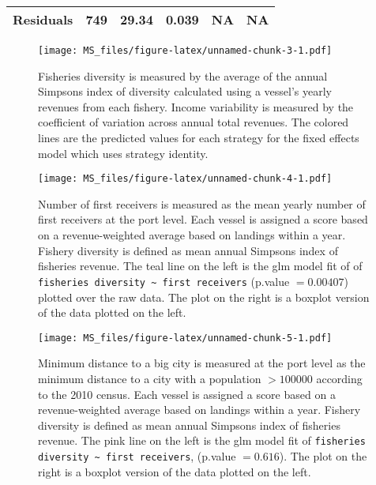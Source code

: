 \documentclass[]{article}
\begin{document}
\begin{longtable}[c]{@{}llllll@{}}
\begin{minipage}[t]{0.36\columnwidth}\raggedright\strut
\textbf{Residuals}
\strut\end{minipage} &
\begin{minipage}[t]{0.05\columnwidth}\raggedright\strut
749
\strut\end{minipage} &
\begin{minipage}[t]{0.10\columnwidth}\raggedright\strut
29.34
\strut\end{minipage} &
\begin{minipage}[t]{0.11\columnwidth}\raggedright\strut
0.039
\strut\end{minipage} &
\begin{minipage}[t]{0.11\columnwidth}\raggedright\strut
NA
\strut\end{minipage} &
\begin{minipage}[t]{0.11\columnwidth}\raggedright\strut
NA
\strut\end{minipage}\tabularnewline
\bottomrule
\end{longtable}

\begin{figure}[htbp]
\centering
\texttt{[image: MS\_files/figure-latex/unnamed-chunk-3-1.pdf]}
\caption{Fisheries diversity is measured by the average of the annual
Simpsons index of diversity calculated using a vessel's yearly revenues
from each fishery. Income variability is measured by the coefficient of
variation across annual total revenues. The colored lines are the
predicted values for each strategy for the fixed effects model which
uses strategy identity.}
\end{figure}

\begin{figure}[htbp]
\centering
\texttt{[image: MS\_files/figure-latex/unnamed-chunk-4-1.pdf]}
\caption{Number of first receivers is measured as the mean yearly number
of first receivers at the port level. Each vessel is assigned a score
based on a revenue-weighted average based on landings within a year.
Fishery diversity is defined as mean annual Simpsons index of fisheries
revenue. The teal line on the left is the glm model fit of of
\texttt{fisheries diversity \textasciitilde{} first receivers} (p.value
\(= 0.00407\)) plotted over the raw data. The plot on the right is a
boxplot version of the data plotted on the left.}
\end{figure}

\begin{figure}[htbp]
\centering
\texttt{[image: MS\_files/figure-latex/unnamed-chunk-5-1.pdf]}
\caption{Minimum distance to a big city is measured at the port level as
the minimum distance to a city with a population \(>100000\) according
to the 2010 census. Each vessel is assigned a score based on a
revenue-weighted average based on landings within a year. Fishery
diversity is defined as mean annual Simpsons index of fisheries revenue.
The pink line on the left is the glm model fit of
\texttt{fisheries diversity \textasciitilde{} first receivers}, (p.value
\(= 0.616\)). The plot on the right is a boxplot version of the data
plotted on the left.}
\end{figure}
\end{document}
